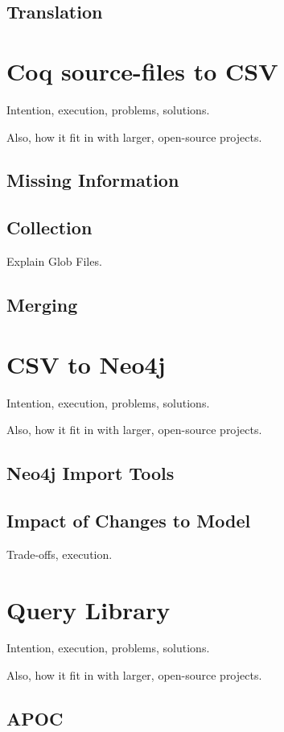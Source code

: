 \subsection{Translation}

\section{Coq source-files to CSV}
Intention, execution, problems, solutions.

Also, how it fit in with larger, open-source projects.

\subsection{Missing Information}

\subsection{Collection}
Explain Glob Files.

\subsection{Merging}

\section{CSV to Neo4j}
Intention, execution, problems, solutions.

Also, how it fit in with larger, open-source projects.

\subsection{Neo4j Import Tools}

\subsection{Impact of Changes to Model}
Trade-offs, execution.

\section{Query Library}
Intention, execution, problems, solutions.

Also, how it fit in with larger, open-source projects.

\subsection{APOC}

